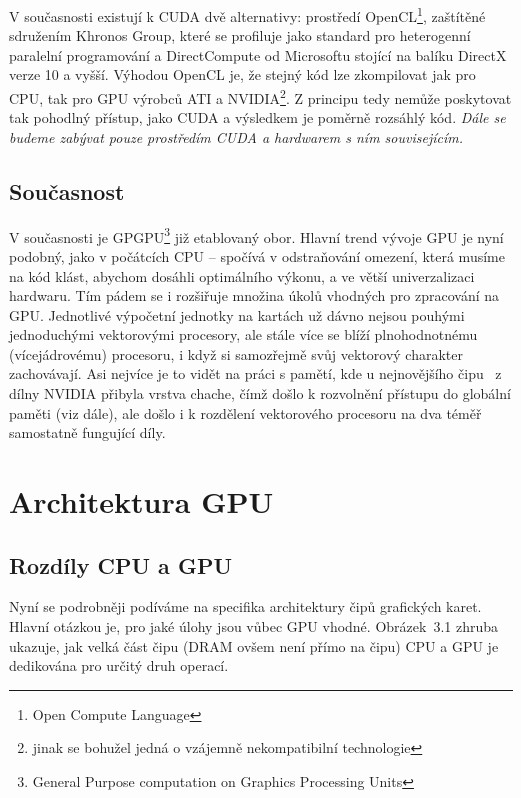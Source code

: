     V současnosti existují k CUDA dvě alternativy: prostředí OpenCL\footnote{Open Compute Language}, zaštítěné sdružením Khronos Group, které se profiluje jako standard pro heterogenní paralelní programování a DirectCompute od Microsoftu stojící na balíku DirectX verze 10 a vyšší. Výhodou OpenCL je, že stejný kód lze zkompilovat jak pro CPU, tak pro GPU výrobců ATI a NVIDIA\footnote{jinak se bohužel jedná o vzájemně nekompatibilní technologie}. Z principu tedy nemůže poskytovat tak pohodlný přístup, jako CUDA a výsledkem je poměrně rozsáhlý kód. \emph{Dále se budeme zabývat pouze prostředím CUDA a hardwarem s ním souvisejícím.}

    \subsection{Současnost}

     V současnosti je GPGPU\footnote{General Purpose computation on Graphics Processing Units} již etablovaný obor. Hlavní trend vývoje GPU je nyní podobný, jako v počátcích CPU -- spočívá v odstraňování omezení, která musíme na kód klást, abychom dosáhli optimálního výkonu, a ve větší univerzalizaci hardwaru. Tím pádem se i rozšiřuje množina úkolů vhodných pro zpracování na GPU. Jednotlivé výpočetní jednotky na kartách už dávno nejsou pouhými jednoduchými vektorovými procesory, ale stále více se blíží plnohodnotnému (vícejádrovému) procesoru, i když si samozřejmě svůj vektorový charakter zachovávají. Asi nejvíce je to vidět na práci s pamětí, kde u nejnovějšího čipu \FERMI ~z dílny NVIDIA přibyla vrstva chache, čímž došlo k rozvolnění přístupu do globální paměti (viz dále), ale došlo i k rozdělení vektorového procesoru na dva téměř samostatně fungující díly.

\section{Architektura GPU}

    \subsection{Rozdíly CPU a GPU}

        Nyní se podrobněji podíváme na specifika architektury čipů grafických karet. Hlavní otázkou je, pro jaké úlohy jsou vůbec GPU vhodné. Obrázek~3.1 zhruba ukazuje, jak velká část čipu (DRAM ovšem není přímo na čipu) CPU a GPU je dedikována pro určitý druh operací.

